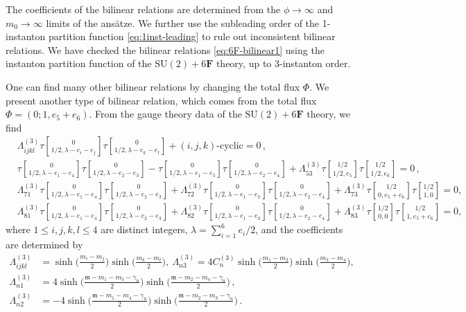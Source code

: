 \documentclass[11pt, a4paper]{article}
\newcommand{\tauftn}[2]{\tau\genfrac[]{0pt}{1}{#1}{#2}}
\theoremstyle{definition}
\begin{document}
The coefficients of the bilinear relations are determined from the $ \phi \to \infty $ and $ m_0 \to \infty $ limits of the ans\"atze. We further use the subleading order of the 1-instanton partition function \eqref{eq:1inst-leading} to rule out inconsistent bilinear relations. We have checked the bilinear relations \eqref{eq:6F-bilinear1} using the instanton partition function of the $ \mathrm{SU}(2)+6\mathbf{F} $ theory, up to 3-instanton order.

One can find many other bilinear relations by changing the total flux $ \Phi $. We present another type of bilinear relation, which comes from the total flux $ \Phi=(0;1,e_5+e_6) $. From the gauge theory data of the $ \mathrm{SU}(2)+6\mathbf{F} $ theory, we find
\begin{align}\label{eq:6F-bilinear3}
    &\Lambda_{ijkl}^{(3)} \tauftn{0}{1/2,\lambda-e_i-e_j} \tauftn{0}{1/2,\lambda-e_k-e_l} + (i,j,k)\text{-cyclic} = 0 \, , \\
    &\tauftn{0}{1/2,\lambda-e_1-e_4} \tauftn{0}{1/2,\lambda-e_2-e_3} - \tauftn{0}{1/2,\lambda-e_1-e_3} \tauftn{0}{1/2,\lambda-e_2-e_4} + \Lambda_{53}^{(3)} \tauftn{1/2}{1/2,e_5} \tauftn{1/2}{1/2,e_6} = 0 \, , \nonumber \\
    &\Lambda_{71}^{(3)} \tauftn{0}{1/2,\lambda-e_1-e_4} \tauftn{0}{1/2,\lambda-e_2-e_3} \!+\! \Lambda_{72}^{(3)} \tauftn{0}{1/2,\lambda-e_1-e_3} \tauftn{0}{1/2,\lambda-e_2-e_4} \!+\! \Lambda_{73}^{(3)} \tauftn{1/2}{0,e_5+e_6} \tauftn{1/2}{1,0} \!=\! 0 , \nonumber  \\
    &\Lambda_{81}^{(3)} \tauftn{0}{1/2,\lambda-e_1-e_4} \tauftn{0}{1/2,\lambda-e_2-e_3} \!+\! \Lambda_{82}^{(3)} \tauftn{0}{1/2,\lambda-e_1-e_3} \tauftn{0}{1/2,\lambda-e_2-e_4} \!+\! \Lambda_{83}^{(3)} \tauftn{1/2}{0,0} \tauftn{1/2}{1,e_5+e_6} \!=\! 0 , \nonumber
\end{align}
where $ 1 \leq i,j,k,l \leq 4 $ are distinct integers, $ \lambda=\sum_{i=1}^6 e_i/2 $, and the coefficients are determined by
\begin{align}
    \Lambda_{ijkl}^{(3)} &= \sinh\Big(\frac{m_i-m_j}{2}\Big) \sinh\Big(\frac{m_k-m_l}{2}\Big) , \
    \Lambda_{n3}^{(3)} = 4C_n^{(3)} \sinh\Big(\frac{m_1-m_2}{2}\Big) \sinh\Big(\frac{m_3-m_4}{2}\Big) , \nonumber \\
    \Lambda_{n1}^{(3)} &= 4\sinh\Big(\frac{\mathfrak{m}-m_1-m_3 - \gamma_n}{2}\Big) \sinh\Big(\frac{\mathfrak{m}-m_2-m_4 - \gamma_n}{2}\Big) \, , \nonumber \\
    \Lambda_{n2}^{(3)} &= -4\sinh\Big(\frac{\mathfrak{m}-m_1-m_4 - \gamma_n}{2}\Big) \sinh\Big(\frac{\mathfrak{m}-m_2-m_3 - \gamma_n}{2}\Big) \, .
\end{align}
\end{document}
